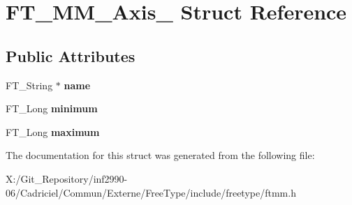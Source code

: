 \hypertarget{struct_f_t___m_m___axis__}{\section{F\-T\-\_\-\-M\-M\-\_\-\-Axis\-\_\- Struct Reference}
\label{struct_f_t___m_m___axis__}
}
\subsection*{Public Attributes}
\begin{DoxyCompactItemize}
\item 
\hypertarget{struct_f_t___m_m___axis___a5c784efa44906c0e2b715eb1f866a09f}{F\-T\-\_\-\-String $\ast$ {\bfseries name}}\label{struct_f_t___m_m___axis___a5c784efa44906c0e2b715eb1f866a09f}

\item 
\hypertarget{struct_f_t___m_m___axis___a9dc31f02b350b1356e0896673b5b73a4}{F\-T\-\_\-\-Long {\bfseries minimum}}\label{struct_f_t___m_m___axis___a9dc31f02b350b1356e0896673b5b73a4}

\item 
\hypertarget{struct_f_t___m_m___axis___addac1f8e71da1bedea9b393ae2751881}{F\-T\-\_\-\-Long {\bfseries maximum}}\label{struct_f_t___m_m___axis___addac1f8e71da1bedea9b393ae2751881}

\end{DoxyCompactItemize}


The documentation for this struct was generated from the following file\-:\begin{DoxyCompactItemize}
\item 
X\-:/\-Git\-\_\-\-Repository/inf2990-\/06/\-Cadriciel/\-Commun/\-Externe/\-Free\-Type/include/freetype/ftmm.\-h\end{DoxyCompactItemize}
